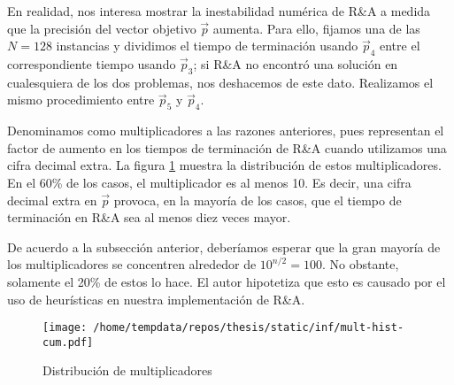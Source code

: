 En realidad, nos interesa mostrar la inestabilidad numérica de R\&A a medida que la precisión del
vector objetivo $\vec{p}$ aumenta. Para ello, fijamos una de las $N = 128$ instancias y dividimos el
tiempo de terminación usando $\vec{p}_4$ entre el correspondiente tiempo usando $\vec{p}_3$; si
R\&A no encontró una solución en cualesquiera de los dos problemas, nos deshacemos de este
dato. Realizamos el mismo procedimiento entre $\vec{p}_5$ y $\vec{p}_4$.

Denominamos como multiplicadores a las razones anteriores, pues representan el factor de aumento en
los tiempos de terminación de R\&A cuando utilizamos una cifra decimal extra. La figura
\ref{fig:exp:inf:hist} muestra la distribución de estos multiplicadores. En el 60\% de los casos, el
multiplicador es al menos 10. Es decir, una cifra decimal extra en $\vec{p}$ provoca, en la mayoría
de los casos, que el tiempo de terminación en R\&A sea al menos diez veces mayor.

De acuerdo a la subsección anterior, deberíamos esperar que la gran mayoría de los multiplicadores
se concentren alrededor de $10^{n/2} = 100$. No obstante, solamente el 20\% de estos lo hace. El
autor hipotetiza que esto es causado por el uso de heurísticas en nuestra implementación de R\&A.

\begin{figure}[hbtp]
	\centering
    \texttt{[image: /home/tempdata/repos/thesis/static/inf/mult-hist-cum.pdf]}
	\caption{Distribución de multiplicadores}
	\label{fig:exp:inf:hist}
\end{figure}

